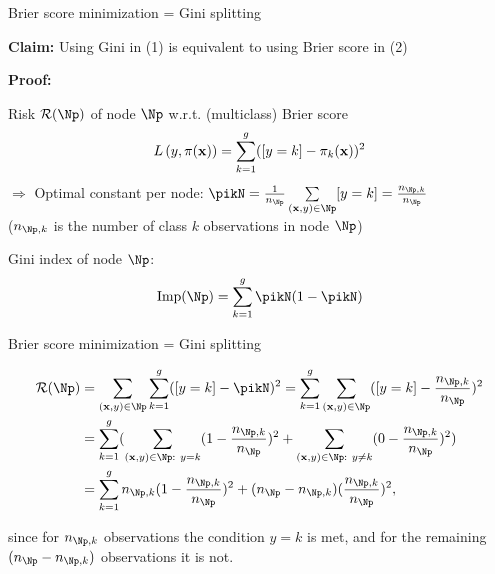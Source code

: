 \documentclass[11pt,compress,t,notes=noshow, xcolor=table]{beamer}
\begin{document}
\begin{frame}{Brier score minimization = Gini splitting}

\textbf{Claim:} Using Gini in (1) 
    is equivalent to using Brier score in (2) %
    

\textbf{Proof:} %

Risk $\risk(\Np)$ of node $\Np$ w.r.t. (multiclass) Brier score
$$
  L\left(y, \pi(\mathbf{x})\right) = \sum_{k = 1}^g ([y = k] - \pi_k(\mathbf{x}))^2
$$
$\Rightarrow$ Optimal constant per node: $\pikN = \frac{1}{n_{\Np}} \sum\limits_{(\xv,y) \in \Np} [y = k] = \frac{n_{\Np,k}}{n_{\Np }}$ \\ ($n_{\Np,k}$ is the number of class $k$ observations in node $\Np$) \\

\vfill

Gini index of node $\Np$:
$$
\text{Imp}(\Np) = \sum_{k=1}^g \pikN (1-\pikN ) %
$$


\end{frame}
\begin{frame2}[footnotesize]{Brier score minimization = Gini splitting}

\begin{align*}
\risk(\Np) &= \sum_{\xy \in \Np}  \sum_{k = 1}^g ([y = k] - \pikN)^2 
= \sum_{k = 1}^g \sum_{\xy \in \Np} ([y = k] - \frac{n_{\Np,k}}{n_{\Np }})^2\\
&= \sum_{k = 1}^{g} (\sum_{\xy \in \Np: ~ y = k} (1 - \frac{n_{\Np,k}}{n_{\Np }})^2 + \sum_{\xy \in \Np: ~ y \ne k} (0 - \frac{n_{\Np,k}}{n_{\Np }})^2) \\
&= \sum_{k = 1}^g n_{\Np,k}(1 - \frac{n_{\Np,k}}{n_{\Np }})^2 + (n_{\Np } - n_{\Np,k})(\frac{n_{\Np,k}}{n_{\Np }})^2, 
\end{align*}

since for $n_{\Np,k}$ observations the condition $y = k$ is met, and for the remaining $(n_\Np - n_{\Np,k})$ observations it is not. 

\end{frame2}
\end{document}
